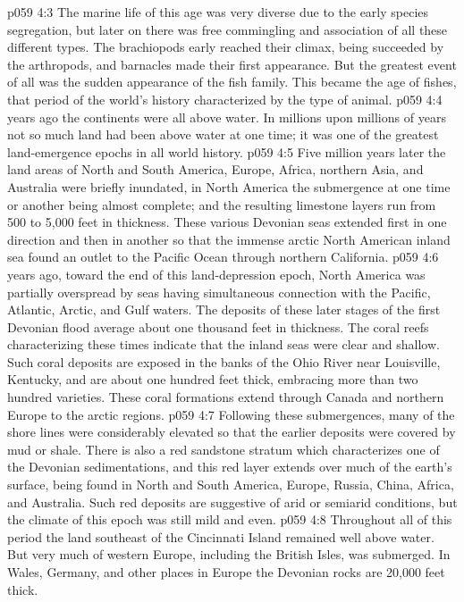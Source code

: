 \vs p059 4:3 The marine life of this age was very diverse due to the early species segregation, but later on there was free commingling and association of all these different types. The brachiopods early reached their climax, being succeeded by the arthropods, and barnacles made their first appearance. But the greatest event of all was the sudden appearance of the fish family. This became the age of fishes, that period of the world’s history characterized by the  type of animal.
\pc \vs p059 4:4  years ago the continents were all above water. In millions upon millions of years not so much land had been above water at one time; it was one of the greatest land\hyp{}emergence epochs in all world history.
\vs p059 4:5 Five million years later the land areas of North and South America, Europe, Africa, northern Asia, and Australia were briefly inundated, in North America the submergence at one time or another being almost complete; and the resulting limestone layers run from 500 to 5,000 feet in thickness. These various Devonian seas extended first in one direction and then in another so that the immense arctic North American inland sea found an outlet to the Pacific Ocean through northern California.
\pc \vs p059 4:6  years ago, toward the end of this land\hyp{}depression epoch, North America was partially overspread by seas having simultaneous connection with the Pacific, Atlantic, Arctic, and Gulf waters. The deposits of these later stages of the first Devonian flood average about one thousand feet in thickness. The coral reefs characterizing these times indicate that the inland seas were clear and shallow. Such coral deposits are exposed in the banks of the Ohio River near Louisville, Kentucky, and are about one hundred feet thick, embracing more than two hundred varieties. These coral formations extend through Canada and northern Europe to the arctic regions.
\vs p059 4:7 Following these submergences, many of the shore lines were considerably elevated so that the earlier deposits were covered by mud or shale. There is also a red sandstone stratum which characterizes one of the Devonian sedimentations, and this red layer extends over much of the earth’s surface, being found in North and South America, Europe, Russia, China, Africa, and Australia. Such red deposits are suggestive of arid or semiarid conditions, but the climate of this epoch was still mild and even.
\vs p059 4:8 Throughout all of this period the land southeast of the Cincinnati Island remained well above water. But very much of western Europe, including the British Isles, was submerged. In Wales, Germany, and other places in Europe the Devonian rocks are 20,000 feet thick.
